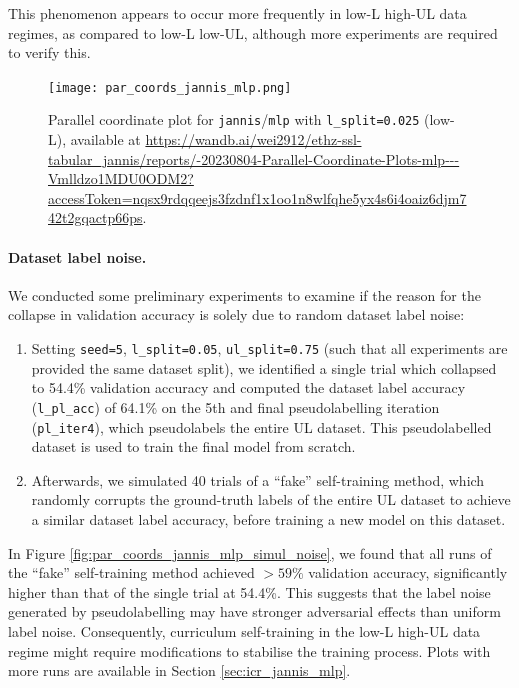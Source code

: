 \documentclass{article}
\begin{document}
This phenomenon appears to occur more frequently in low-L high-UL data regimes, as
compared to low-L low-UL, although more experiments are required to verify this.

\begin{figure}[htbp]
  \centering
  \texttt{[image: par\_coords\_jannis\_mlp.png]}
  \caption{Parallel coordinate plot for \texttt{jannis}/\texttt{mlp} with
  \texttt{l\_split=0.025} (low-L), available at
  {\small\url{https://wandb.ai/wei2912/ethz-ssl-tabular_jannis/reports/-20230804-Parallel-Coordinate-Plots-mlp---Vmlldzo1MDU0ODM2?accessToken=nqsx9rdqqeejs3fzdnf1x1oo1n8wlfqhe5yx4s6i4oaiz6djm742t2gqactp66ps}}.}
  \label{fig:par_coords_jannis_mlp}
\end{figure}

\afterpage{\clearpage}
\paragraph{Dataset label noise.}
We conducted some preliminary experiments to examine if the reason for the collapse in
validation accuracy is solely due to random dataset label noise:
\begin{enumerate}
  \item Setting \texttt{seed=5}, \texttt{l\_split=0.05}, \texttt{ul\_split=0.75} (such
  that all experiments are provided the same dataset split), we identified a single
  trial which collapsed to 54.4\% validation accuracy and computed the dataset label
  accuracy (\texttt{l\_pl\_acc}) of 64.1\% on the 5th and final pseudolabelling
  iteration (\texttt{pl\_iter4}), which pseudolabels the entire UL dataset.
  This pseudolabelled dataset is used to train the final model from scratch.
  \item Afterwards, we simulated 40 trials of a ``fake'' self-training method, which
  randomly corrupts the ground-truth labels of the entire UL dataset to achieve a
  similar dataset label accuracy, before training a new model on this dataset.
\end{enumerate}
In Figure \ref{fig:par_coords_jannis_mlp_simul_noise}, we found that all runs of the
``fake'' self-training method achieved $> 59\%$ validation accuracy, significantly
higher than that of the single trial at 54.4\%.
This suggests that the label noise generated by pseudolabelling may have stronger
adversarial effects than uniform label noise.
Consequently, curriculum self-training in the low-L high-UL data regime might require
modifications to stabilise the training process.
Plots with more runs are available in Section \ref{sec:icr_jannis_mlp}.
\end{document}
